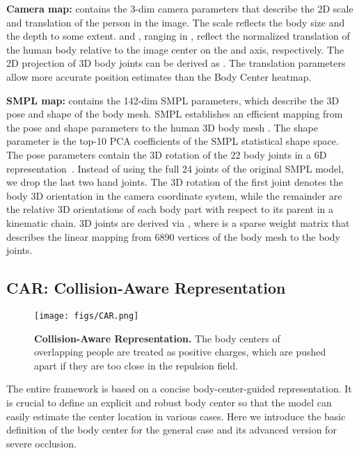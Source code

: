 \documentclass[10pt,twocolumn,letterpaper]{article}
\begin{document}
\textbf{Camera map:}  contains the 3-dim camera parameters  that describe the 2D scale  and translation  of the person in the image. 
The scale  reflects the body size and the depth to some extent.
 and , ranging in , reflect the normalized translation of the human body relative to the image center on the  and  axis, respectively.
The 2D projection  of  3D body joints  can be derived as  .
The translation parameters allow more accurate position estimates than the Body Center heatmap. 

\textbf{SMPL map:}   contains the 142-dim SMPL parameters, which describe the 3D pose and shape of the body mesh. 
SMPL establishes an efficient mapping from the pose    and shape  parameters to the human 3D body mesh .
The shape parameter  is the top-10 PCA coefficients of the SMPL statistical shape space. 
The pose parameters  contain the 3D rotation of the 22 body joints in a 6D representation~\cite{Zhou_2019_CVPR}.  
Instead of using the full 24 joints of the original SMPL model, we drop the last two hand joints. 
The 3D rotation of the first joint denotes the body 3D orientation in the camera coordinate system, 
while the remainder are the relative 3D orientations of each body part with respect to its parent in a kinematic chain. 
3D joints  are derived via , where  is a sparse weight matrix that describes the linear mapping from 6890 vertices of the body mesh  to the  body joints.

\subsection{CAR: Collision-Aware Representation~\label{sec:CAR}}

\begin{figure}[t]
	\centering
	\texttt{[image: figs/CAR.png]} \caption{{\bf Collision-Aware Representation.} The body centers of overlapping people are treated as positive charges, which are pushed apart if they are too close in the repulsion field. }
	\label{fig:CAR}
\end{figure}

The entire framework is based on a concise body-center-guided representation. 
It is crucial to define an explicit and robust body center so that the model can easily estimate the center location in various cases. 
Here we introduce the basic definition of the body center for the general case and its advanced version for severe occlusion.
\end{document}
